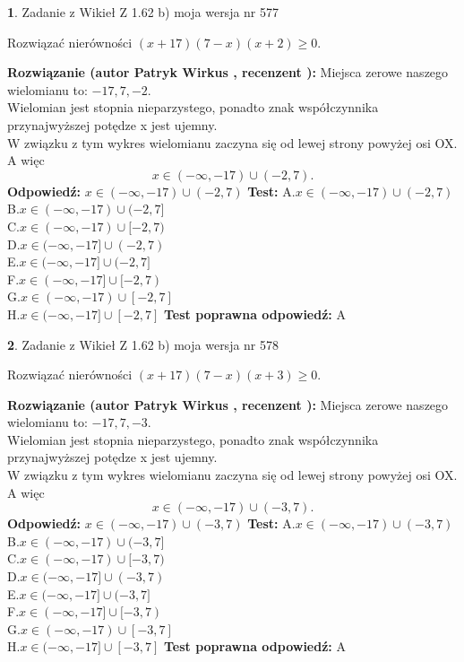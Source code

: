 \documentclass[12pt, a4paper]{article}
\theoremstyle{definition} %
\newtheorem{zad}{}
\newcommand{\zadStart}[1]{\begin{zad}#1\newline}
\newcommand{\zadStop}{\end{zad}}
\newcommand{\rozwStart}[2]{\noindent \textbf{Rozwiązanie (autor #1 , recenzent #2): }\newline}
\newcommand{\rozwStop}{\newline}
\newcommand{\odpStart}{\noindent \textbf{Odpowiedź:}\newline}
\newcommand{\odpStop}{\newline}
\newcommand{\testStart}{\noindent \textbf{Test:}\newline}
\newcommand{\testStop}{\newline}
\newcommand{\kluczStart}{\noindent \textbf{Test poprawna odpowiedź:}\newline}
\newcommand{\kluczStop}{\newline}
\begin{document}
\zadStart{Zadanie z Wikieł Z 1.62 b) moja wersja nr 577}

Rozwiązać nierówności $(x+17)(7-x)(x+2)\ge0$.
\zadStop
\rozwStart{Patryk Wirkus}{}
Miejsca zerowe naszego wielomianu to: $-17, 7, -2$.\\
Wielomian jest stopnia nieparzystego, ponadto znak współczynnika przy\linebreak najwyższej potędze x jest ujemny.\\ W związku z tym wykres wielomianu zaczyna się od lewej strony powyżej osi OX. A więc $$x \in (-\infty,-17) \cup (-2,7).$$
\rozwStop
\odpStart
$x \in (-\infty,-17) \cup (-2,7)$
\odpStop
\testStart
A.$x \in (-\infty,-17) \cup (-2,7)$\\
B.$x \in (-\infty,-17) \cup (-2,7]$\\
C.$x \in (-\infty,-17) \cup [-2,7)$\\
D.$x \in (-\infty,-17] \cup (-2,7)$\\
E.$x \in (-\infty,-17] \cup (-2,7]$\\
F.$x \in (-\infty,-17] \cup [-2,7)$\\
G.$x \in (-\infty,-17) \cup [-2,7]$\\
H.$x \in (-\infty,-17] \cup [-2,7]$
\testStop
\kluczStart
A
\kluczStop



\zadStart{Zadanie z Wikieł Z 1.62 b) moja wersja nr 578}

Rozwiązać nierówności $(x+17)(7-x)(x+3)\ge0$.
\zadStop
\rozwStart{Patryk Wirkus}{}
Miejsca zerowe naszego wielomianu to: $-17, 7, -3$.\\
Wielomian jest stopnia nieparzystego, ponadto znak współczynnika przy\linebreak najwyższej potędze x jest ujemny.\\ W związku z tym wykres wielomianu zaczyna się od lewej strony powyżej osi OX. A więc $$x \in (-\infty,-17) \cup (-3,7).$$
\rozwStop
\odpStart
$x \in (-\infty,-17) \cup (-3,7)$
\odpStop
\testStart
A.$x \in (-\infty,-17) \cup (-3,7)$\\
B.$x \in (-\infty,-17) \cup (-3,7]$\\
C.$x \in (-\infty,-17) \cup [-3,7)$\\
D.$x \in (-\infty,-17] \cup (-3,7)$\\
E.$x \in (-\infty,-17] \cup (-3,7]$\\
F.$x \in (-\infty,-17] \cup [-3,7)$\\
G.$x \in (-\infty,-17) \cup [-3,7]$\\
H.$x \in (-\infty,-17] \cup [-3,7]$
\testStop
\kluczStart
A
\kluczStop
\end{document}
